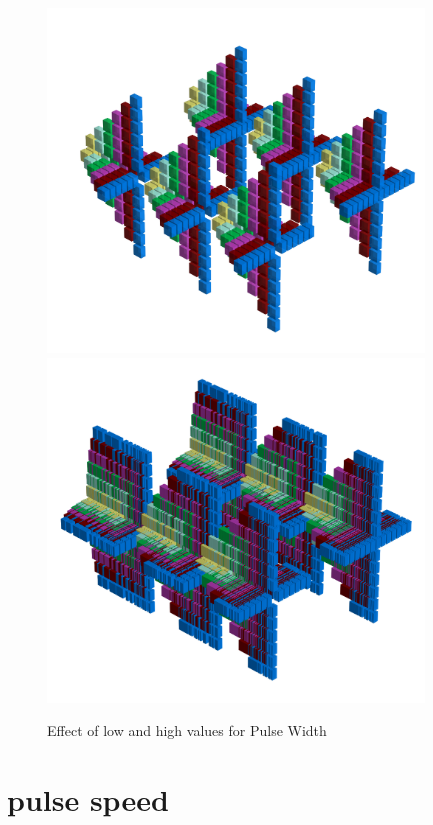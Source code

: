 \begin{figure}[H]
    \centering
    \begin{adjustbox}{width=15cm,center}
      \includegraphics[width=10cm]{src/pulsewidth/pattern0-45.png}%
      \includegraphics[width=10cm]{src/pulsewidth/pattern1-45.png}%
    \end{adjustbox}
    \caption{Effect of low and high values for Pulse Width}
\end{figure}
\clearpage
{}
\section*{pulse speed}
\label{sec:pulse_speed}
\lstset{style=6502Style}
\lstset{ 
   aboveskip=5pt,
   belowskip=0pt,
}

